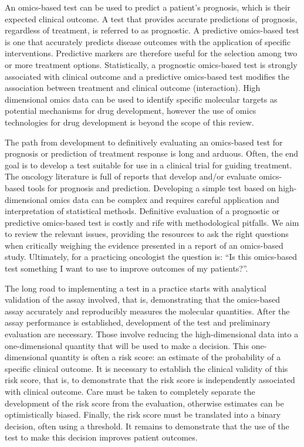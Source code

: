 \documentclass[11pt]{article}
\begin{document}
An omics-based test can be used to predict a patient's prognosis, which
is their expected clinical outcome. A test that provides accurate
predictions of prognosis, regardless of treatment, is referred to as
prognostic. A predictive omics-based test is one that accurately
predicts disease outcomes with the application of specific
interventions. Predictive markers are therefore useful for the selection
among two or more treatment options. Statistically, a prognostic
omics-based test is strongly associated with clinical outcome and a
predictive omics-based test modifies the association between treatment
and clinical outcome (interaction). High dimensional omics data can be
used to identify specific molecular targets as potential mechanisms for
drug development, however the use of omics technologies for drug
development is beyond the scope of this review.

The path from development to definitively evaluating an omics-based test
for prognosis or prediction of treatment response is long and arduous.
Often, the end goal is to develop a test suitable for use in a clinical
trial for guiding treatment. The oncology literature is full of reports
that develop and/or evaluate omics-based tools for prognosis and
prediction. Developing a simple test based on high-dimensional omics
data can be complex and requires careful application and interpretation
of statistical methods. Definitive evaluation of a prognostic or
predictive omics-based test is costly and rife with methodological
pitfalls. We aim to review the relevant issues, providing the resources
to ask the right questions when critically weighing the evidence
presented in a report of an omics-based study. Ultimately, for a
practicing oncologist the question is: ``Is this omics-based test
something I want to use to improve outcomes of my patients?''.

The long road to implementing a test in a practice starts with
analytical validation of the assay involved, that is, demonstrating that
the omics-based assay accurately and reproducibly measures the molecular
quantities. After the assay performance is established, development of
the test and preliminary evaluation are necessary. Those involve
reducing the high-dimensional data into a one-dimensional quantity that
will be used to make a decision. This one-dimensional quantity is often
a risk score: an estimate of the probability of a specific clinical
outcome. It is necessary to establish the clinical validity of this risk
score, that is, to demonstrate that the risk score is independently
associated with clinical outcome. Care must be taken to completely
separate the development of the risk score from the evaluation,
otherwise estimates can be optimistically biased. Finally, the risk
score must be translated into a binary decision, often using a
threshold. It remains to demonstrate that the use of the test to make
this decision improves patient outcomes.
\end{document}
